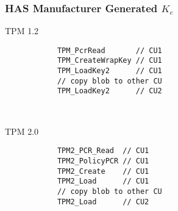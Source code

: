 {\subsubsection{HAS Manufacturer Generated $K_e$}
\begin{center}
	\begin{minipage}{0.4\linewidth}
		\begin{center}
			TPM 1.2
		\end{center}
		\begin{tpmcommands}
			\begin{verbatim}
			TPM_PcrRead       // CU1
			TPM_CreateWrapKey // CU1
			TPM_LoadKey2      // CU1
			// copy blob to other CU
			TPM_LoadKey2      // CU2
			\end{verbatim}
		\end{tpmcommands}
	\end{minipage}
	~~~~~~~~
	\begin{minipage}{0.4\linewidth}
		\begin{center}
			TPM 2.0
		\end{center}
		\begin{tpmcommands}
			\begin{verbatim}
			TPM2_PCR_Read  // CU1
			TPM2_PolicyPCR // CU1
			TPM2_Create    // CU1
			TPM2_Load      // CU1
			// copy blob to other CU
			TPM2_Load      // CU2
			\end{verbatim}
		\end{tpmcommands}
	\end{minipage}
\end{center}

}
